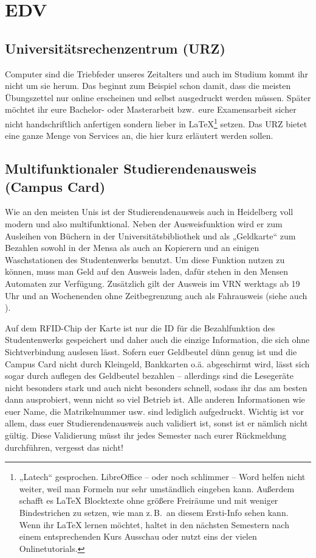\section{EDV}

\subsection{Universitätsrechenzentrum (URZ)}
\label{urz}
Computer sind die Triebfeder unseres Zeitalters und auch im Studium kommt ihr nicht um sie herum. Das beginnt zum Beispiel schon damit, dass die meisten Übungszettel nur online erscheinen und selbst ausgedruckt werden müssen. Später möchtet ihr eure Bachelor- oder Masterarbeit bzw.\ eure Examensarbeit sicher nicht handschriftlich anfertigen sondern lieber in \LaTeX \footnote{„Latech“ gesprochen. LibreOffice -- oder noch schlimmer -- Word helfen nicht weiter, weil man Formeln nur sehr umständlich eingeben kann. Außerdem schafft es \LaTeX{} Blocktexte ohne größere Freiräume und mit weniger Bindestrichen zu setzen, wie man z.\,B.\ an diesem Ersti-Info sehen kann. Wenn ihr \LaTeX{} lernen möchtet, haltet in den nächsten Semestern nach einem entsprechenden Kurs Ausschau oder nutzt eins der vielen Onlinetutorials.} setzen. Das \gls{URZ} bietet eine ganze Menge von Services an, die hier kurz erläutert werden sollen.

\subsection*{Multifunktionaler Studierendenausweis (Campus Card)}
\label{campuscard}
Wie an den meisten Unis ist der Studierendenausweis auch in Heidelberg voll modern und also multifunktional. Neben der Ausweisfunktion wird er zum Ausleihen von Büchern in der Universitätsbibliothek und als „Geldkarte“ zum Bezahlen sowohl in der Mensa als auch an Kopierern und an einigen Waschstationen des Studentenwerks benutzt. Um diese Funktion nutzen zu können, muss man Geld auf den Ausweis laden, dafür stehen in den Mensen Automaten zur Verfügung. Zusätzlich gilt der Ausweis im \gls{VRN} werktags ab 19 Uhr und an Wochenenden ohne Zeitbegrenzung auch als Fahrausweis (siehe auch ).

Auf dem RFID-Chip der Karte ist nur die ID für die Bezahlfunktion des Studentenwerks gespeichert und daher auch die einzige Information, die sich ohne Sichtverbindung auslesen lässt. Sofern euer Geldbeutel dünn genug ist und die Campus Card nicht durch Kleingeld, Bankkarten o.ä. abgeschirmt wird, lässt sich sogar durch auflegen des Geldbeutel bezahlen -- allerdings sind die Lesegeräte nicht besonders stark und auch nicht besonders schnell, sodass ihr das am besten dann ausprobiert, wenn nicht so viel Betrieb ist. Alle anderen Informationen wie euer Name, die Matrikelnummer usw. sind lediglich aufgedruckt. Wichtig ist vor allem, dass euer Studierendenausweis auch validiert ist, sonst ist er nämlich nicht gültig. Diese Validierung müsst ihr jedes Semester nach eurer Rückmeldung durchführen, vergesst das nicht!

